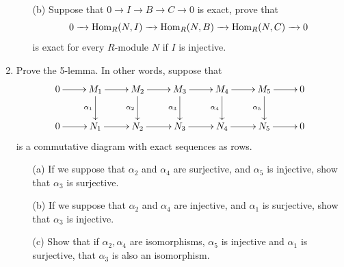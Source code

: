 \documentclass[11pt]{amsart}
\theoremstyle{theorem}
\renewcommand{\to}[1][]{\xrightarrow{\ #1\ }}
\newcommand{\Hom}{\textnormal{Hom}}
\begin{document}
\begin{enumerate}
\begin{itemize}
    \item[(b)]  Suppose that $0 \to I \to B \to C \to 0$ is exact, prove that
    \[
    0 \to \Hom_R(N, I) \to \Hom_R(N, B) \to \Hom_R(N, C) \to 0
    \]
    is exact for every $R$-module $N$ if $I$ is injective.
    \end{itemize}
\item Prove the 5-lemma.  In other words, suppose that
\[
\xymatrix{
0 \ar[r] & M_1 \ar[d]_{\alpha_1} \ar[r] &M_2 \ar[d]_{\alpha_2} \ar[r] &M_3 \ar[d]_{\alpha_3} \ar[r] &M_4 \ar[d]_{\alpha_4} \ar[r] &M_5 \ar[d]_{\alpha_5} \ar[r] & 0\\
0 \ar[r] & N_1 \ar[r] &N_2 \ar[r] &N_3 \ar[r] &N_4 \ar[r] &N_5 \ar[r] & 0
}
\]
is a commutative diagram with exact sequences as rows.
\begin{itemize}
\item[(a)]  If we suppose that $\alpha_2$ and $\alpha_4$ are surjective, and $\alpha_5$ is injective, show that $\alpha_3$ is surjective.
\item[(b)]  If we suppose that $\alpha_2$ and $\alpha_4$ are injective, and $\alpha_1$ is surjective, show that $\alpha_3$ is injective.
\item[(c)]  Show that if $\alpha_2, \alpha_4$ are isomorphisms, $\alpha_5$ is injective and $\alpha_1$ is surjective, that $\alpha_3$ is also an isomorphism.
\end{itemize}
\end{enumerate}
\end{document}
